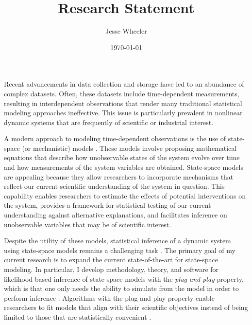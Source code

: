 \documentclass{article}
\title{Research Statement}
\author{Jesse Wheeler}
\date{\today}
\begin{document}
\rule{0mm}{1mm}
\vspace{-20mm}


\vspace{1mm}

\rule{0mm}{1mm}

\vspace{3mm}
\rule{0mm}{1mm}

\vspace{4mm}

\noindent Recent advancements in data collection and storage have led to an abundance of complex datasets.
Often, these datasets include time-dependent measurements, resulting in interdependent observations that render many traditional statistical modeling approaches ineffective.
This issue is particularly prevalent in nonlinear dynamic systems that are frequently of scientific or industrial interest.

A modern approach to modeling time-dependent observations is the use of state-space (or mechanistic) models \cite{durbin12}.
These models involve proposing mathematical equations that describe how unobservable states of the system evolve over time and how measurements of the system variables are obtained.
State-space models are appealing because they allow researchers to incorporate mechanisms that reflect our current scientific understanding of the system in question.
This capability enables researchers to estimate the effects of potential interventions on the system, provides a framework for statistical testing of our current understanding against alternative explanations, and facilitates inference on unobservable variables that may be of scientific interest.

Despite the utility of these models, statistical inference of a dynamic system using state-space models remains a challenging task \cite{auger16}.
The primary goal of my current research is to expand the current state-of-the-art for state-space modeling.
In particular, I develop methodology, theory, and software for likelihood based inference of state-space models with the {\it plug-and-play} property, which is that one only needs the ability to simulate from the model in order to perform inference \cite{breto09}.
Algorithms with the plug-and-play property enable researchers to fit models that align with their scientific objectives instead of being limited to those that are statistically convenient \cite{wheeler24}.
\end{document}
